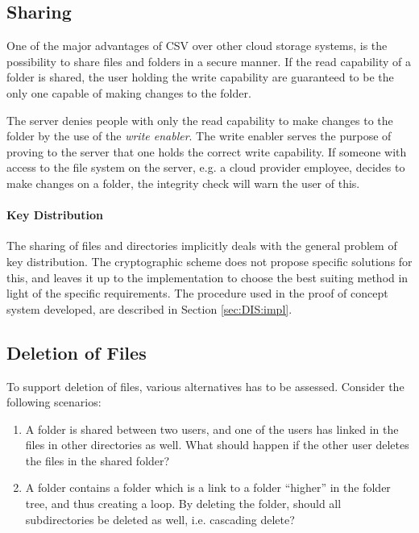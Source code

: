 \documentclass[pdftex,english,10pt,b5paper,twoside]{book}
\begin{document}
\subsection{Sharing}

One of the major advantages of \ac{CSV} over other cloud storage systems, is
the possibility to share files and folders in a secure manner. If the read
capability of a folder is shared, the user holding the write capability are
guaranteed to be the only one capable of making changes to the folder.

The server denies people with only the read capability to make changes to the
folder by the use of the \emph{write enabler}. The write enabler serves the
purpose of proving to the server that one holds the correct write capability.
If someone with access to the file system on the server, e.g. a cloud
provider employee, decides to make changes on a folder, the integrity check
will warn the user of this.

\paragraph{Key Distribution} The sharing of files and directories implicitly
deals with the general problem of key distribution. The cryptographic scheme
does not propose specific solutions for this, and leaves it up to the
implementation to choose the best suiting method in light of the specific
requirements. The procedure used in the proof of concept system developed, are
described in Section \ref{sec:DIS:impl}.

\subsection{Deletion of Files}

To support deletion of files, various alternatives has to be assessed.
Consider the following scenarios:

\begin{enumerate}
  \item A folder is shared between two users, and one of the users has
    linked in the files in other directories as well. What should happen if the
    other user deletes the files in the shared folder?

  \item A folder contains a folder which is a link to a folder ``higher''
    in the folder tree, and thus creating a loop. By deleting the folder,
    should all subdirectories be deleted as well, i.e. cascading delete?
\end{enumerate}
\end{document}
